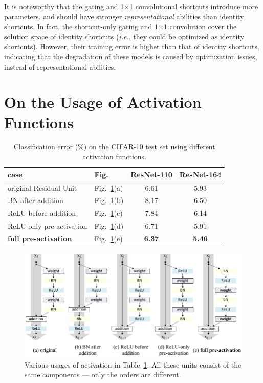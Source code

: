 \documentclass[runningheads]{llncs}
\def\ie{\emph{i.e.}}
\begin{document}
It is noteworthy that the gating and 1$\times$1 convolutional shortcuts introduce more parameters, and should have stronger \emph{representational} abilities than identity shortcuts. In fact, the shortcut-only gating and 1$\times$1 convolution cover the solution space of identity shortcuts (\ie, they could be optimized as identity shortcuts). However, their training error is higher than that of identity shortcuts, indicating that the degradation of these models is caused by optimization issues, instead of representational abilities.


\section{On the Usage of Activation Functions}
\label{sec:activations}


\renewcommand\arraystretch{1.3}
\setlength{\tabcolsep}{6pt}
\begin{table}[t]
\caption{Classification error (\%) on the CIFAR-10 test set using different activation functions.}\label{tab:activations}
\centering
\fontsize{8pt}{1em}\selectfont
\begin{tabular}{l|l|c|c}
\hline
case & Fig. & ResNet-110 & ResNet-164 \\
\hline
\hline
original Residual Unit \cite{He2016} & Fig.~\ref{fig:activations}(a) & 6.61 & 5.93 \\
\hline
BN after addition & Fig.~\ref{fig:activations}(b) & 8.17 & 6.50 \\
\hline
ReLU before addition & Fig.~\ref{fig:activations}(c) & 7.84 & 6.14 \\
ReLU-only pre-activation & Fig.~\ref{fig:activations}(d) & 6.71 & 5.91 \\
\textbf{full pre-activation} & Fig.~\ref{fig:activations}(e) & \textbf{6.37} & \textbf{5.46} \\
\hline
\end{tabular}
\end{table}

\begin{figure}[t]
\centering
\includegraphics[width=.99\linewidth]{eps/activations}
\caption{Various usages of activation in Table~\ref{tab:activations}. All these units consist of the same components --- only the orders are different.}
\label{fig:activations}
\end{figure}
\end{document}
